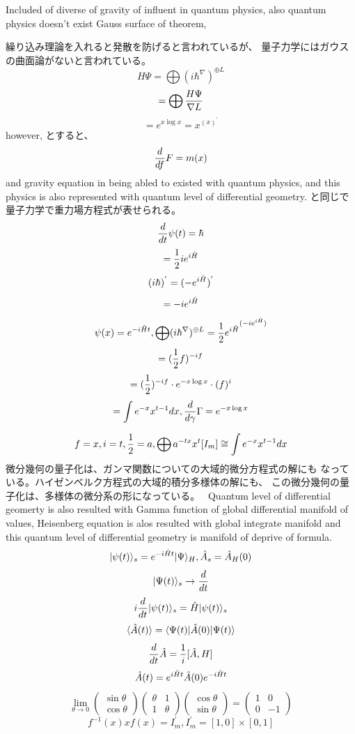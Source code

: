 \documentclass{jsarticle}
\begin{document}
    Included of diverse of gravity of influent in quantum physics,
    also quantum physics doesn't exist Gauss surface of theorem,
   
    繰り込み理論を入れると発散を防げると言われているが、
    量子力学にはガウスの曲面論がないと言われている。
    $$ H \Psi = \bigoplus (i \hbar ^{\nabla})^{\oplus L} $$
    $$ = \bigoplus {{ H \Psi} \over \nabla L} $$
    $$ = e^{x \log x} = x^{(x)^{'}} $$
    however,
    とすると、
    $$ {d \over df}F = m(x) $$
    and gravity equation in being abled to existed with quantum physics,
    and this physics is also represented with quantum level of differential
    geometry.
    と同じで量子力学で重力場方程式が表せられる。
    $$ {d \over dt}\psi(t) = \hbar $$
    $$ = {1 \over 2}i e^{i \Hat{H}} $$
    $$ (i \hbar)^{'} = (- e^{i \Hat{H}})^{'} $$
    $$ = - i e^{i \Hat{H}} $$
    $$ \psi(x) = e^{-i \Hat{H}t}, \bigoplus (i \hbar ^{\nabla})^{\oplus L} 
    = {{{1 \over 2} e^{i \Hat{H}}}^{(-i e^{i \Hat{H}})}} $$
    $$ = ({1 \over 2}f)^{-i f}$$
    $$ = ({1 \over 2})^{-i f} \cdot e^{-x \log x} \cdot (f)^{i} $$
    $$ = \int e^{- x} x^{t - 1}dx, {d \over d \gamma}\Gamma = e^{-x \log x}  $$
     
    $$ f = x, i = t, {1 \over 2} = a, \bigoplus a^{-t x}x^t [I_m]
     \cong \int e^{-x} x^{t - 1}dx $$
    微分幾何の量子化は、ガンマ関数についての大域的微分方程式の解にも
    なっている。ハイゼンベルク方程式の大域的積分多様体の解にも、
    この微分幾何の量子化は、多様体の微分系の形になっている。　
    Quantum level of differential geomerty is also resulted with
    Gamma function of global differential manifold of values, Heisenberg
    equation is alos resulted with global integrate manifold and this
    quantum level of differential geometry is manifold of deprive of formula.
    $$ |\psi(t)\rangle_s = e^{-i\Hat{H} t}|\Psi\rangle_{H},
    \Hat{A}_s = \Hat{A}_H(0) $$
    $$ |\Psi(t)\rangle_s \to {d \over dt} $$
    $$ i {d \over dt}|\psi (t) \rangle_s = \Hat{H}|\psi(t)\rangle_s $$
    $$ \langle\Hat{A}(t)\rangle = \langle\Psi(t)|\Hat{A}(0)|\Psi(t)\rangle  $$
    $$ {d \over dt}\Hat{A} = {1 \over i}[\Hat{A},H] $$
    $$ \Hat{A}(t) = e^{i\Hat{H}t}\Hat{A}(0)e^{-i\Hat{H}t} $$
    $$ \lim_{\theta \to 0} \begin{pmatrix} \sin \theta \\
    \cos \theta \end{pmatrix} \begin{pmatrix} \theta & 1 \\
    1 & \theta \end{pmatrix} \begin{pmatrix} \cos \theta \\
    \sin \theta \end{pmatrix} = \begin{pmatrix} 1 & 0 \\
    0 & - 1 \end{pmatrix} $$
    $$ f^{-1}(x) x f(x) = I^{'}_m, I^{'}_m = [1,0] \times [0,1] $$
\end{document}
